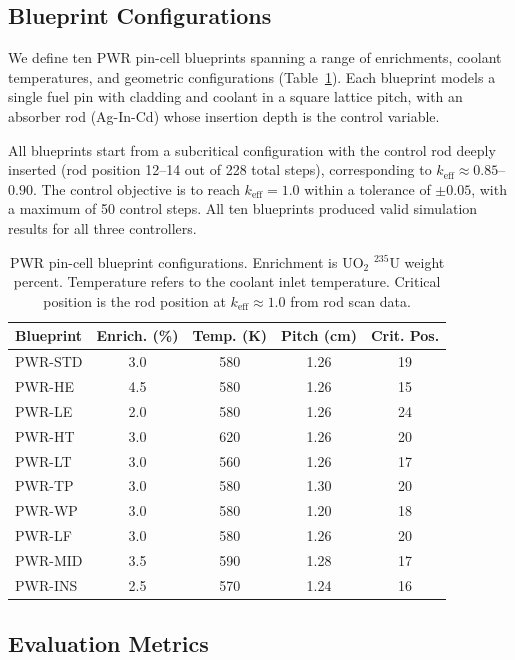 \documentclass[11pt,twocolumn]{article}
\begin{document}
\subsection{Blueprint Configurations}

We define ten PWR pin-cell blueprints spanning a range of enrichments, coolant temperatures, and geometric configurations (Table~\ref{tab:blueprints}).
Each blueprint models a single fuel pin with cladding and coolant in a square lattice pitch, with an absorber rod (Ag-In-Cd) whose insertion depth is the control variable.

All blueprints start from a subcritical configuration with the control rod deeply inserted (rod position 12--14 out of 228 total steps), corresponding to $k_\text{eff} \approx 0.85$--$0.90$.
The control objective is to reach $k_\text{eff} = 1.0$ within a tolerance of $\pm 0.05$, with a maximum of 50 control steps.
All ten blueprints produced valid simulation results for all three controllers.

\begin{table}[t]
\centering
\caption{PWR pin-cell blueprint configurations. Enrichment is UO$_2$ $^{235}$U weight percent. Temperature refers to the coolant inlet temperature. Critical position is the rod position at $k_\text{eff} \approx 1.0$ from rod scan data.}
\label{tab:blueprints}
\small
\begin{tabular}{@{}lcccc@{}}
\toprule
Blueprint & Enrich. (\%) & Temp. (K) & Pitch (cm) & Crit. Pos. \\
\midrule
PWR-STD & 3.0 & 580 & 1.26 & 19 \\
PWR-HE  & 4.5 & 580 & 1.26 & 15 \\
PWR-LE  & 2.0 & 580 & 1.26 & 24 \\
PWR-HT  & 3.0 & 620 & 1.26 & 20 \\
PWR-LT  & 3.0 & 560 & 1.26 & 17 \\
PWR-TP  & 3.0 & 580 & 1.30 & 20 \\
PWR-WP  & 3.0 & 580 & 1.20 & 18 \\
PWR-LF  & 3.0 & 580 & 1.26 & 20 \\
PWR-MID & 3.5 & 590 & 1.28 & 17 \\
PWR-INS & 2.5 & 570 & 1.24 & 16 \\
\bottomrule
\end{tabular}
\end{table}

\subsection{Evaluation Metrics}
\end{document}
